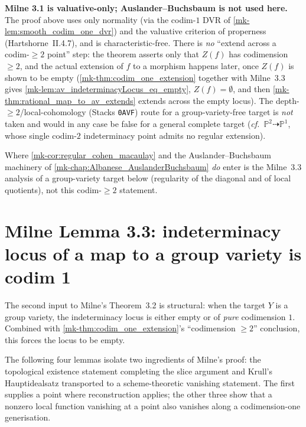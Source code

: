 \begin{remark}
  \label{mk-rmk:codim1_role_of_ab}
  \textbf{Milne 3.1 is valuative-only; Auslander--Buchsbaum is not used here.} The proof
  above uses only normality (via the codim-\(1\) DVR of \ref{mk-lem:smooth_codim_one_dvr})
  and the valuative criterion of properness (Hartshorne~II.4.7), and is
  characteristic-free. There is \emph{no} ``extend across a codim-\(\geq 2\) point'' step:
  the theorem asserts only that \(Z(f)\) has codimension \(\geq 2\), and the actual
  extension of \(f\) to a morphism happens later, once \(Z(f)\) is shown to be empty
  (\ref{mk-thm:codim_one_extension} together with Milne~3.3 gives
  \ref{mk-lem:av_indeterminacyLocus_eq_empty}, \(Z(f) = \emptyset\), and then
  \ref{mk-thm:rational_map_to_av_extends} extends across the empty locus). The
  depth-\(\geq 2\)/local-cohomology (Stacks \texttt{0AVF}) route for a group-variety-free
  target is \emph{not} taken and would in any case be false for a general complete target
  (\emph{cf.}\ \(\mathbb P^2 \dashrightarrow \mathbb P^1\), whose single codim-\(2\)
  indeterminacy point admits no regular extension).

  Where \ref{mk-cor:regular_cohen_macaulay} and the Auslander--Buchsbaum machinery of
  \ref{mk-chap:Albanese_AuslanderBuchsbaum} \emph{do} enter is the Milne~3.3 analysis of a
  group-variety target below (regularity of the diagonal and of local quotients), not
  this codim-\(\geq 2\) statement.
\end{remark}

\section{Milne Lemma 3.3: indeterminacy locus of a map to a group variety is codim 1}
\label{mk-sec:milne_lem33}

The second input to Milne's Theorem~3.2 is structural: when the target \(Y\) is a group
variety, the indeterminacy locus is either empty or of \emph{pure} codimension \(1\).
Combined with \ref{mk-thm:codim_one_extension}'s ``codimension \(\geq 2\)'' conclusion,
this forces the locus to be empty.

The following four lemmas isolate two ingredients of Milne's proof: the
topological existence statement completing the slice argument and Krull's
Hauptidealsatz transported to a scheme-theoretic vanishing statement.  The
first supplies a point where reconstruction applies; the other three show that
a nonzero local function vanishing at a point also vanishes along a
codimension-one generisation.

